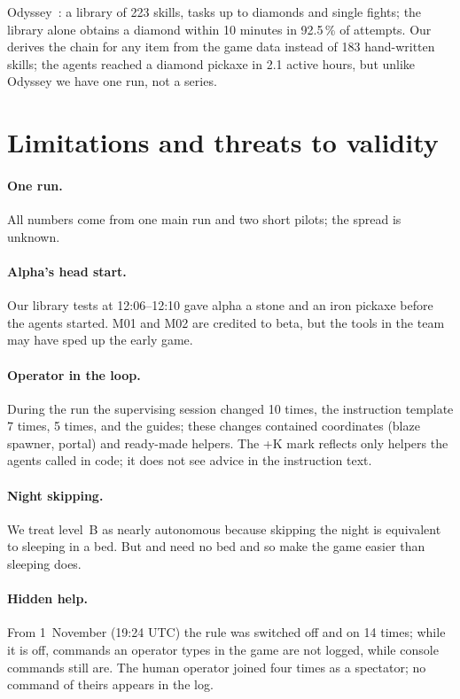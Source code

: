 \documentclass[11pt]{article}
\begin{document}
Odyssey~\citep{odyssey}: a library of 223 skills, tasks up to diamonds and single fights; the library alone obtains a diamond within 10 minutes in 92.5\,\% of attempts. Our  derives the chain for any item from the game data instead of 183 hand-written skills; the agents reached a diamond pickaxe in 2.1 active hours, but unlike Odyssey we have one run, not a series.

\section{Limitations and threats to validity}\label{sec:limits}
\paragraph{One run.} All numbers come from one main run and two short pilots; the spread is unknown.
\paragraph{Alpha's head start.} Our library tests at 12:06--12:10 gave alpha a stone and an iron pickaxe before the agents started. M01 and M02 are credited to beta, but the tools in the team may have sped up the early game.
\paragraph{Operator in the loop.} During the run the supervising  session changed  10 times, the instruction template 7 times,  5 times, and the guides; these changes contained coordinates (blaze spawner, portal) and ready-made helpers. The +K mark reflects only helpers the agents called in code; it does not see advice in the instruction text.
\paragraph{Night skipping.} We treat level~B as nearly autonomous because skipping the night is equivalent to sleeping in a bed. But  and  need no bed and so make the game easier than sleeping does.
\paragraph{Hidden help.} From 1~November (19:24 UTC) the  rule was switched off and on 14 times; while it is off, commands an operator types in the game are not logged, while console commands still are. The human operator joined four times as a spectator; no command of theirs appears in the log.
\end{document}
